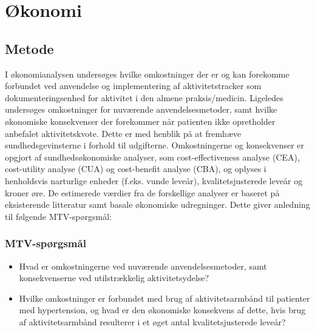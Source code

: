 \chapter{Økonomi}

\section{Metode}
I økonomianalysen undersøges hvilke omkostninger der er og kan forekomme forbundet ved anvendelse og implementering af aktivitetstracker som dokumenteringsenhed for aktivitet i den almene praksis/medicin.
Ligeledes undersøges omkostninger for nuværende anvendelsesmetoder, samt hvilke økonomiske konsekvenser der forekommer når patienten ikke opretholder anbefalet aktivitetskvote.
Dette er med henblik på at fremhæve sundhedsgevinsterne i forhold til udgifterne.   
Omkostningerne og konsekvenser er opgjort af sundhedsøkonomiske analyser, som cost-effectiveness analyse (CEA), cost-utility analyse (CUA) og cost-benefit analyse (CBA), og oplyses i henholdsvis narturlige enheder (f.eks. vunde leveår), kvalitetsjusterede leveår og kroner øre. 
De estimerede værdier fra de forskellige analyser er baseret på eksisterende litteratur samt basale økonomiske udregninger.
Dette giver anledning til følgende MTV-spørgsmål: 

\subsection{MTV-spørgsmål}
 
\begin{itemize}
\item Hvad er omkostningerne ved nuværende anvendelsesmetoder, samt konsekvenserne ved utilstrækkelig aktivitetsydelse? 

\item Hvilke omkostninger er forbundet med brug af aktivitetsarmbånd til patienter med hypertension, og hvad er den økonomiske konsekvens af dette, hvis brug af aktivitetsarmbånd resulterer i et øget antal kvalitetsjusterede leveår?


\end{itemize}
 



